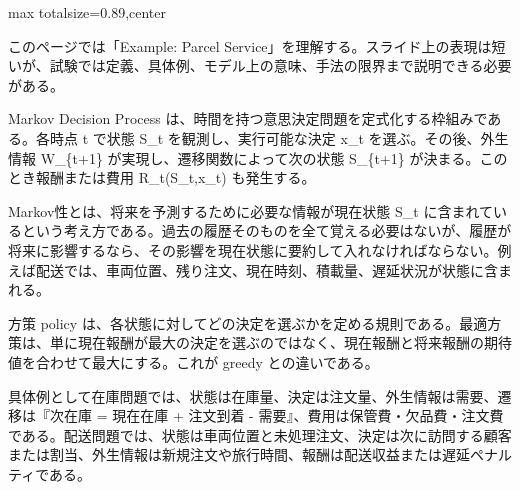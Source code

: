 \begin{minipage}[t]{0.58\textwidth}
\begin{adjustbox}{max totalsize={\textwidth}{0.89\textheight},center}
\begin{minipage}{\textwidth}\scriptsize
{}このページでは「Example: Parcel Service」を理解する。スライド上の表現は短いが、試験では定義、具体例、モデル上の意味、手法の限界まで説明できる必要がある。\par
Markov Decision Process は、時間を持つ意思決定問題を定式化する枠組みである。各時点 t で状態 S\_t を観測し、実行可能な決定 x\_t を選ぶ。その後、外生情報 W\_\{t+1\} が実現し、遷移関数によって次の状態 S\_\{t+1\} が決まる。このとき報酬または費用 R\_t(S\_t,x\_t) も発生する。\par
Markov性とは、将来を予測するために必要な情報が現在状態 S\_t に含まれているという考え方である。過去の履歴そのものを全て覚える必要はないが、履歴が将来に影響するなら、その影響を現在状態に要約して入れなければならない。例えば配送では、車両位置、残り注文、現在時刻、積載量、遅延状況が状態に含まれる。\par
方策 policy は、各状態に対してどの決定を選ぶかを定める規則である。最適方策は、単に現在報酬が最大の決定を選ぶのではなく、現在報酬と将来報酬の期待値を合わせて最大にする。これが greedy との違いである。\par
具体例として在庫問題では、状態は在庫量、決定は注文量、外生情報は需要、遷移は『次在庫 = 現在在庫 + 注文到着 - 需要』、費用は保管費・欠品費・注文費である。配送問題では、状態は車両位置と未処理注文、決定は次に訪問する顧客または割当、外生情報は新規注文や旅行時間、報酬は配送収益または遅延ペナルティである。\par

\end{minipage}
\end{adjustbox}
\end{minipage}
